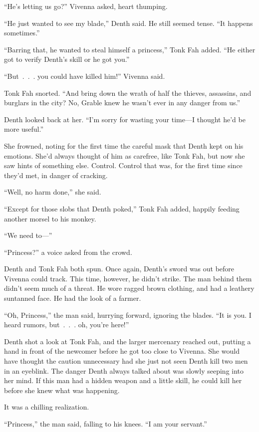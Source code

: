 “He’s letting us go?” Vivenna asked, heart thumping.

“He just wanted to see my blade,” Denth said. He still seemed tense. “It happens sometimes.”

“Barring that, he wanted to steal himself a princess,” Tonk Fah added. “He either got to verify Denth’s skill or he got you.”

“But~.~.~. you could have killed him!” Vivenna said.

Tonk Fah snorted. “And bring down the wrath of half the thieves, assassins, and burglars in the city? No, Grable knew he wasn’t ever in any danger from us.”

Denth looked back at her. “I’m sorry for wasting your time—I thought he’d be more useful.”

She frowned, noting for the first time the careful mask that Denth kept on his emotions. She’d always thought of him as carefree, like Tonk Fah, but now she saw hints of something else. Control. Control that was, for the first time since they’d met, in danger of cracking.

“Well, no harm done,” she said.

“Except for those slobs that Denth poked,” Tonk Fah added, happily feeding another morsel to his monkey.

“We need to—”

“Princess?” a voice asked from the crowd.

Denth and Tonk Fah both spun. Once again, Denth’s sword was out before Vivenna could track. This time, however, he didn’t strike. The man behind them didn’t seem much of a threat. He wore ragged brown clothing, and had a leathery suntanned face. He had the look of a farmer.

“Oh, Princess,” the man said, hurrying forward, ignoring the blades. “It is you. I heard rumors, but~.~.~. oh, you’re here!”

Denth shot a look at Tonk Fah, and the larger mercenary reached out, putting a hand in front of the newcomer before he got too close to Vivenna. She would have thought the caution unnecessary had she just not seen Denth kill two men in an eyeblink. The danger Denth always talked about was slowly seeping into her mind. If this man had a hidden weapon and a little skill, he could kill her before she knew what was happening.

It was a chilling realization.

“Princess,” the man said, falling to his knees. “I am your servant.”

